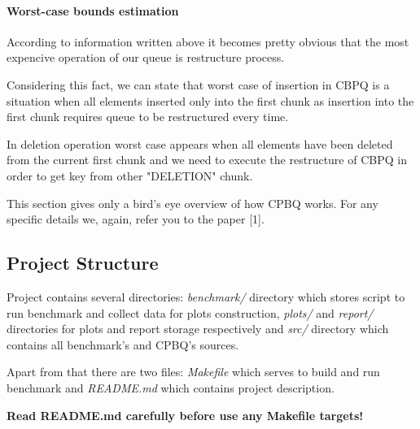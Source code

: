 \documentclass{article}
\begin{document}
\paragraph{Worst-case bounds estimation}\mbox{}\par 
According to information written above it becomes pretty obvious that the most expencive operation of our queue is restructure process.\par
Considering this fact, we can state that worst case of insertion in CBPQ is a situation when all elements inserted only into the first chunk as insertion into the first chunk requires queue to be restructured every time.\par
In deletion operation worst case appears when all elements have been deleted from the current first chunk and we need to execute the restructure of CBPQ in order to get key from other "DELETION" chunk.\newline\par
This section gives only a bird's eye overview of how CPBQ works. For any specific details we, again, refer you to the paper [1].

\subsection{Project Structure}
Project contains several directories:\textit{ benchmark/} directory which stores script to run benchmark and collect data for plots construction, \textit{plots/} and \textit{report/} directories for plots and report storage respectively and \textit{src/} directory which contains all benchmark's and CPBQ's sources.\par
Apart from that there are two files: \textit{Makefile} which serves to build and run benchmark and \textit{README.md} which contains project description.\par
\textbf{Read README.md carefully before use any Makefile targets!}
\end{document}
